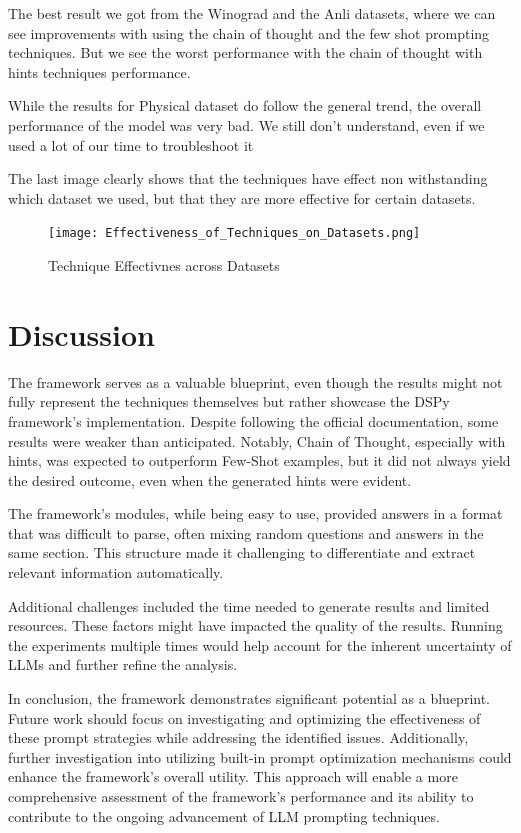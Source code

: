 \documentclass[fleqn,moreauthors,10pt]{ds_report}
\begin{document}
The best result we got from the Winograd and the Anli datasets, where we can see improvements with using the chain of thought and the few shot prompting techniques. But we see the worst performance with the chain of thought with hints techniques performance.



While the results for Physical dataset do follow the general trend, the overall performance of the model was very bad. We still don't understand, even if we used a lot of our time to troubleshoot it


The last image clearly shows that the techniques have effect non withstanding which dataset we used, but that they are more effective for certain datasets.

\begin{figure}[!h]
    \centering
    \texttt{[image: Effectiveness\_of\_Techniques\_on\_Datasets.png]}
    \caption{Technique Effectivnes across Datasets}
    \label{line-graph}
\end{figure}
 

\section*{Discussion}
The framework serves as a valuable blueprint, even though the results might not fully represent the techniques themselves but rather showcase the DSPy framework's implementation. Despite following the official documentation, some results were weaker than anticipated. Notably, Chain of Thought, especially with hints, was expected to outperform Few-Shot examples, but it did not always yield the desired outcome, even when the generated hints were evident.

The framework's modules, while being easy to use, provided answers in a format that was difficult to parse, often mixing random questions and answers in the same section. This structure made it challenging to differentiate and extract relevant information automatically.

Additional challenges included the time needed to generate results and limited resources. These factors might have impacted the quality of the results. Running the experiments multiple times would help account for the inherent uncertainty of LLMs and further refine the analysis.

In conclusion, the framework demonstrates significant potential as a blueprint. Future work should focus on investigating and optimizing the effectiveness of these prompt strategies while addressing the identified issues.  Additionally, further investigation into utilizing built-in prompt optimization mechanisms could enhance the framework's overall utility.
 This approach will enable a more comprehensive assessment of the framework's performance and its ability to contribute to the ongoing advancement of LLM prompting techniques.

 


\end{document}
